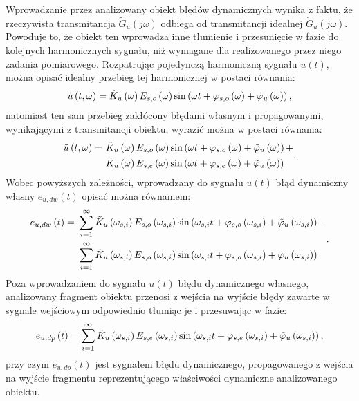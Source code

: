 Wprowadzanie przez analizowany obiekt błędów dynamicznych wynika z faktu, że rzeczywista transmitancja $\tilde{G}_{u}(j\omega)$ odbiega od transmitancji idealnej $\dot{G}_{u}(j\omega)$. Powoduje to, że obiekt ten wprowadza inne tłumienie i przesunięcie w fazie do kolejnych harmonicznych sygnału, niż wymagane dla realizowanego przez niego zadania pomiarowego. Rozpatrując pojedynczą harmoniczną sygnału $u(t)$, można opisać idealny przebieg tej harmonicznej w postaci równania:
\begin{equation}
\dot{u} \left(t,\omega\right) = \dot{K}_{u} \left(\omega\right) E_{s,o} \left(\omega\right) \sin \left( \omega t + \varphi_{s,o} \left(\omega\right) + \dot{\varphi}_{u} \left(\omega\right) \right) \label{eq:mid_cont_omega_ideal},
\end{equation}
natomiast ten sam przebieg zakłócony błędami własnym i propagowanymi, wynikającymi z transmitancji obiektu, wyrazić można w postaci równania:
\begin{equation}
\begin{split}
\tilde{u} \left(t,\omega\right) =~
& \tilde{K}_{u} \left(\omega\right) E_{s,o} \left(\omega\right) \sin \left( \omega t + \varphi_{s,o} \left(\omega\right) + \tilde{\varphi}_{u} \left(\omega\right) \right) + \\
& \tilde{K}_{u} \left(\omega\right) E_{s,e} \left(\omega\right) \sin \left( \omega t + \varphi_{s,e} \left(\omega\right) + \tilde{\varphi}_{u} \left(\omega\right) \right)
\end{split}
\label{eq:mid_cont_omega_real},
\end{equation}
Wobec powyższych zależności, wprowadzany do sygnału $u(t)$ błąd dynamiczny własny $e_{u,dw}(t)$ opisać można równaniem:
\begin{equation}
\begin{split}
e_{u,dw} \left(t\right) =~
& \sum _{i = 1} ^{\infty} \tilde{K}_{u} \left(\omega_{s,i}\right) E_{s,o} \left(\omega_{s,i}\right) \sin \left( \omega_{s,i} t + \varphi_{s,o} \left(\omega_{s,i}\right) + \tilde{\varphi}_{u} \left(\omega_{s,i}\right) \right) - \\
& \sum _{i = 1} ^{\infty} \dot{K}_{u} \left(\omega_{s,i}\right) E_{s,o} \left(\omega_{s,i}\right) \sin \left( \omega_{s,i} t + \varphi_{s,o} \left(\omega_{s,i}\right) + \dot{\varphi}_{u} \left(\omega_{s,i}\right) \right)
\end{split}
\label{eq:mid_cont_err_dyn_self}.
\end{equation}
Poza wprowadzaniem do sygnału $u(t)$ błędu dynamicznego własnego, analizowany fragment obiektu przenosi z wejścia na wyjście błędy zawarte w sygnale wejściowym odpowiednio tłumiąc je i przesuwając w fazie:
\begin{equation}
e_{u,dp} \left(t\right) = \sum _{i = 1} ^{\infty} \tilde{K}_{u} \left(\omega_{s,i}\right) E_{s,e} \left(\omega_{s,i}\right) \sin \left( \omega_{s,i} t + \varphi_{s,e} \left(\omega_{s,i}\right) + \tilde{\varphi}_{u} \left(\omega_{s,i}\right) \right) \label{eq:mid_cont_err_dyn_prop},
\end{equation}
przy czym $e_{u,dp}(t)$ jest sygnałem błędu dynamicznego, propagowanego z wejścia na wyjście fragmentu reprezentującego właściwości dynamiczne analizowanego obiektu.

